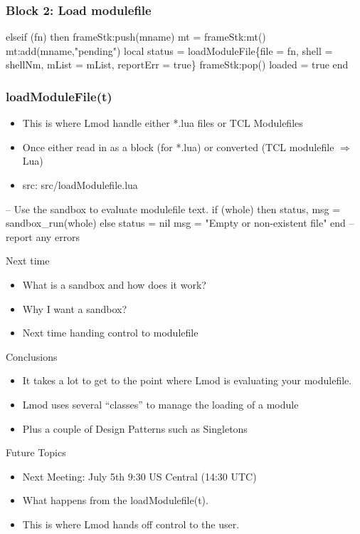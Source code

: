 \documentclass{beamer}
\begin{document}
\begin{frame}[fragile]
    \frametitle{Block 2: Load modulefile}
 {\tiny
    \begin{semiverbatim}
elseif (fn) then
   frameStk:push(mname)
   mt = frameStk:mt()
   mt:add(mname,"pending")
   local status = loadModuleFile\{file = fn, shell = shellNm,
                   mList = mList, reportErr = true\}
   frameStk:pop()
   loaded = true
end
    \end{semiverbatim}
}
\end{frame}

\begin{frame}[fragile]
    \frametitle{loadModuleFile(t)}
  \begin{itemize}
    \item This is where Lmod handle either *.lua files or TCL Modulefiles
    \item Once either read in as a block (for *.lua) or converted (TCL
      modulefile $\Rightarrow$ Lua)
    \item src: src/loadModulefile.lua
  \end{itemize}
 {\tiny
    \begin{semiverbatim}
   -- Use the sandbox to evaluate modulefile text.
   if (whole) then
      status, msg = sandbox_run(whole)
   else
      status = nil
      msg    = "Empty or non-existent file"
   end
   -- report any errors
    \end{semiverbatim}
}

\end{frame}

\begin{frame}{Next time}
  \begin{itemize}
    \item What is a sandbox and how does it work?
    \item Why I want a sandbox?
    \item Next time handing control to modulefile
  \end{itemize}
\end{frame}



\begin{frame}{Conclusions}
  \begin{itemize}
    \item It takes a lot to get to the point where Lmod is evaluating
      your modulefile.
    \item Lmod uses several ``classes'' to manage the loading of a
      module
    \item Plus a couple of Design Patterns such as Singletons  
  \end{itemize}
\end{frame}

\begin{frame}{Future Topics}
  \begin{itemize}
    \item Next Meeting: July 5th 9:30 US Central (14:30 UTC)
    \item What happens from the loadModulefile(t).
    \item This is where Lmod hands off control to the user.
  \end{itemize}
\end{frame}
\end{document}
